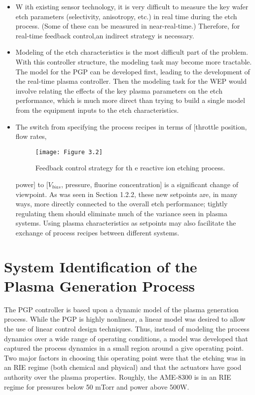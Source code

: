\begin{itemize}
	\item W ith existing sensor technology, it is very difficult to measure the key wafer etch parameters (selectivity, anisotropy, etc.) in real time during the etch process. (Some of these can be measured in near-real-time.) Therefore, for real-time feedback control,an indirect strategy is necessary.
	
	\item
	Modeling of the etch characteristics is the most difficult part of the problem. With this controller structure, the modeling task may become more tractable. The model for the PGP can be developed first, leading to the development of the real-time plasma controller. Then the modeling task for the WEP would involve relating the effects of the key plasma parameters on the etch performance, which is much more direct than trying to build a single model from the equipment inputs to the etch characteristics.
	
	
	\item The switch from specifying the process recipes in terms of [throttle position, flow rates,
	
	\begin{figure}[H]
		\centering
		\texttt{[image: Figure 3.2]}
		\bf\caption{ Feedback control strategy for th e reactive ion etching process.}
		\label{fig:3.2}
	\end{figure}
	
	power] to [$V_{bias}$, pressure, fluorine concentration] is a significant change of viewpoint. As was seen in Section 1.2.2, these new setpoints are, in many ways, more directly
	connected to the overall etch performance; tightly regulating them should eliminate much of the variance seen in plasma systems. Using plasma characteristics as setpoints may also facilitate the exchange of process recipes between different systems.
	
\end{itemize}

\section{System Identification of the Plasma Generation Process}

\tab The PGP controller is based upon a dynamic model of the plasma generation process. While the PGP is highly nonlinear, a linear model was desired to allow the use of linear control design techniques. Thus, instead of modeling the process dynamics over a wide range of operating conditions, a model was developed that captured the process dynamics in a small region around a give operating point. Two major factors in choosing this operating point were that the etching was in an RIE regime (both chemical and physical) and that the actuators have good authority over the plasma properties. Roughly, the AME-8300 is in an RIE regime for pressures below 50 mTorr and power above 500W.

